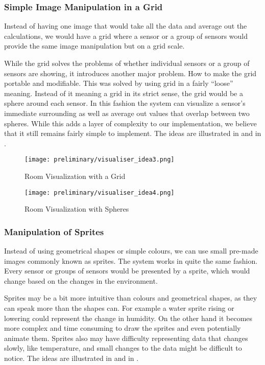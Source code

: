 \documentclass[../document]{subfiles}
\begin{document}
\subsubsection{Simple Image Manipulation in a Grid}
Instead of having one image that would take all the data and average out the calculations, we would have a grid where a sensor or a group of sensors would provide the same image manipulation but on a grid scale.

While the grid solves the problems of whether individual sensors or a group of sensors are showing, it introduces another major problem. How to make the grid portable and modifiable. This was solved by using grid in a fairly “loose” meaning. Instead of it meaning a grid in its strict sense, the grid would be a sphere around each sensor. In this fashion the system can visualize a sensor’s immediate surrounding as well as average out values that overlap between two spheres. While this adds a layer of complexity to our implementation, we believe that it still remains fairly simple to implement. The ideas are illustrated in   and in .

\begin{figure}[H]
	\texttt{[image: preliminary/visualiser\_idea3.png]}
	\caption{Room Visualization with a Grid}
	\label{fig:visualiser_idea3}
\end{figure}

\begin{figure}[H]
	\texttt{[image: preliminary/visualiser\_idea4.png]}
	\caption{Room Visualization with Spheres}
	\label{fig:visualiser_idea4}
\end{figure}

\subsubsection{Manipulation of Sprites}

Instead of using geometrical shapes or simple colours, we can use small pre-made images commonly known as sprites. The system works in quite the same fashion. Every sensor or groups of sensors would be presented by a sprite, which would change based on the changes in the environment.

Sprites may be a bit more intuitive than colours and geometrical shapes, as they can speak more than the shapes can. For example a water sprite rising or lowering could represent the change in humidity. On the other hand it becomes more complex and time consuming to draw the sprites and even potentially animate them. Sprites also may have difficulty representing data that changes slowly, like temperature, and small changes to the data might be difficult to notice. The ideas are illustrated in   and in .
\end{document}
